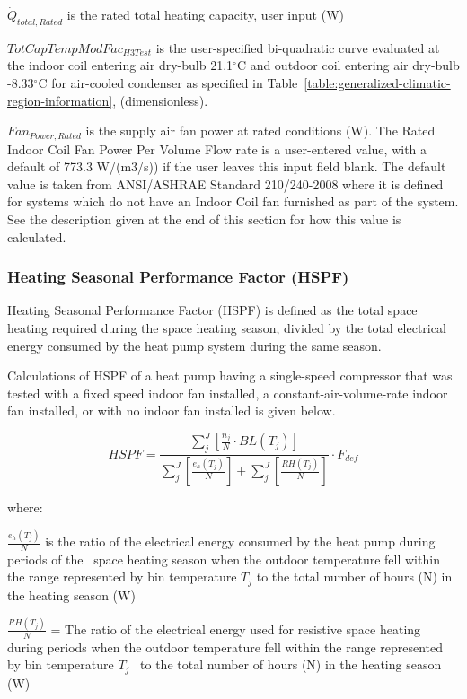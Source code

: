 \({\dot Q_{total,Rated}}\) is the rated total heating capacity, user input (W)

\(TotCapTempModFa{c_{H3Test}}\) is the user-specified bi-quadratic curve evaluated at the indoor coil entering air dry-bulb 21.1\(^{\circ}\)C and outdoor coil entering air dry-bulb -8.33\(^{\circ}\)C for air-cooled condenser as specified in Table~\ref{table:generalized-climatic-region-information}, (dimensionless).

\(Fa{n_{Power,Rated}}\) is the supply air fan power at rated conditions (W). The Rated Indoor Coil Fan Power Per Volume Flow rate is a user-entered value, with a default of 773.3 W/(m3/s)) if the user leaves this input field blank. The default value is taken from ANSI/ASHRAE Standard 210/240-2008 where it is defined for systems which do not have an Indoor Coil fan furnished as part of the system. See the description given at the end of this section for how this value is calculated.

\subsubsection{Heating Seasonal Performance Factor (HSPF)}\label{heating-seasonal-performance-factor-hspf}

Heating Seasonal Performance Factor (HSPF) is defined as the total space heating required during the space heating season, divided by the total electrical energy consumed by the heat pump system during the same season.

Calculations of HSPF of a heat pump having a single-speed compressor that was tested with a fixed speed indoor fan installed, a constant-air-volume-rate indoor fan installed, or with no indoor fan installed is given below.

\begin{equation}
HSPF = \frac{{\sum\limits_j^J {\left[ {\frac{{{n_j}}}{N} \cdot BL({T_j})} \right]} }}{{\sum\limits_j^J {\left[ {\frac{{{e_h}({T_j})}}{N}} \right]}  + \sum\limits_j^J {\left[ {\frac{{RH({T_j})}}{N}} \right]} }} \cdot {F_{def}}
\end{equation}

where:

\(\frac{{{e_h}({T_j})}}{N}\) is the ratio of the electrical energy consumed by the heat pump during periods of the ~space heating season when the outdoor temperature fell within the range represented by bin temperature \({T_j}\) to the total number of hours (N) in the heating season (W)

\(\frac{{RH({T_j})}}{N}\) = The ratio of the electrical energy used for resistive space heating during periods when the outdoor temperature fell within the range represented by bin temperature \({T_j}\) ~to the total number of hours (N) in the heating season (W)

